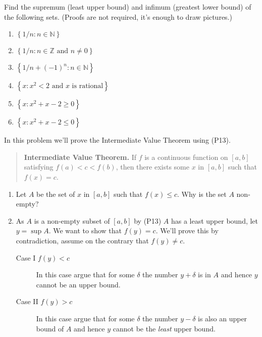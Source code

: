 \documentclass[9pt, a4paper, oneside]{amsart}
\begin{document}
\begin{questions}[resume]
	\item
	Find the supremum (least upper bound) and infimum (greatest lower bound) of the following sets. (Proofs are not required, it's enough to draw pictures.)
	\begin{multicols}{2}
		\begin{enumerate}
			\item $ \left\{ 1/n : n \in \mathbb{N} \right\}$
			\item $ \left\{ 1/n : n \in \mathbb{Z} \mbox{ and } n \neq 0 \right\}$
			\item $ \left\{ 1/n + (-1)^n: n \in \mathbb{N} \right\}$
			\item $ \left\{ x : x^2 < 2 \mbox{ and } x \mbox{ is rational} \right\}$
			\item $ \left\{ x : x^2 + x - 2 \ge 0  \right \}$
			\item $ \left\{ x : x^2 + x - 2 \le 0  \right \}$
		\end{enumerate}
	\end{multicols}

	\item In this problem we'll prove the Intermediate Value Theorem using (P13).
	\begin{quote}
		\textbf{Intermediate Value Theorem.} If $ f$ is a continuous function on $ [a,b]$ satisfying $ f(a) < c < f(b)$, then there exists some $ x$ in $ [a,b]$ such that $ f(x) = c$.
	\end{quote}

	\begin{enumerate}
		\item Let $ A$ be the set of $ x$ in $ [a,b]$ such that $ f(x) \le c$. Why is the set $ A$ non-empty?

		\item 	As $ A$ is a non-empty subset of $ [a,b]$ by (P13) $ A$ has a least upper bound, let $ y = \sup A$. We want to show that $ f(y) = c$. We'll prove this by contradiction, assume on the contrary that $ f(y) \neq c$.
		      \begin{description}
		      	\item[Case I $ f(y) < c$ ] In this case argue that for some $ \delta$ the number $ y + \delta$ is in $ A$ and hence $ y$ cannot be an upper bound.
		      	\item[Case II $ f(y) > c$ ] In this case argue that for some $ \delta$ the number $ y - \delta$ is also an upper bound of $ A$ and hence $ y$ cannot be the \emph{least} upper bound.
		      \end{description}


\end{enumerate}
\end{questions}
\end{document}
